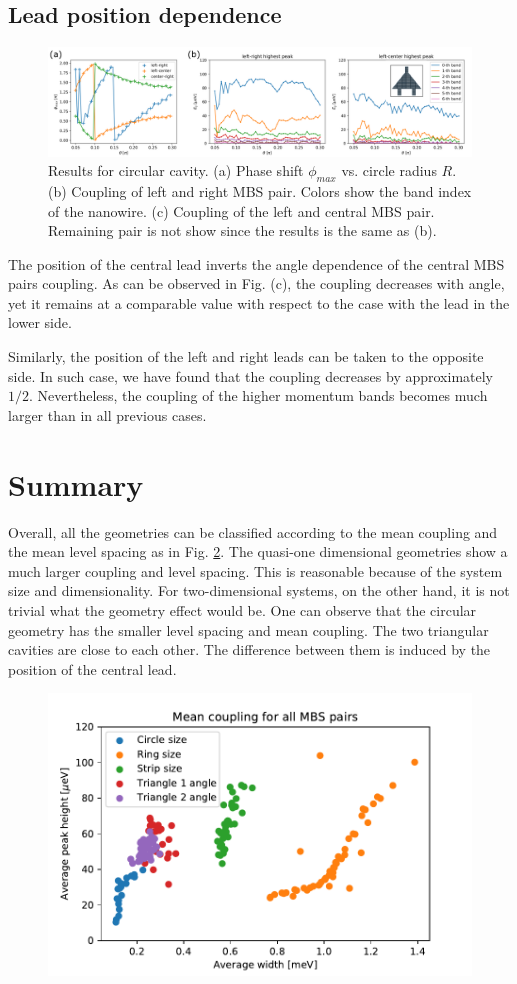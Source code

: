 \subsection{Lead position dependence}

\begin{figure}[h!]
\centering
  \includegraphics[width=0.8\linewidth]{figures/triangle_two_side_results.pdf}
  \caption{Results for circular cavity. (a) Phase shift $\phi_{max}$ vs. circle radius $R$. (b) Coupling of left and right MBS pair. Colors show the band index of the nanowire. (c) Coupling of the left and central MBS pair. Remaining pair is not show since the results is the same as (b).}
  \label{fig:average_ring_coupling}
\end{figure}

The position of the central lead inverts the angle dependence of the central MBS pairs coupling.
As can be observed in Fig. (c), the coupling decreases with angle, yet it remains at a comparable value with respect to the case with the lead in the lower side.

Similarly, the position of the left and right leads can be taken to the opposite side.
In such case, we have found that the coupling decreases by approximately $1/2$.
Nevertheless, the coupling of the higher momentum bands becomes much larger than in all previous cases.

\section{Summary}

Overall, all the geometries can be classified according to the mean coupling and the mean level spacing as in Fig. \ref{fig:comparison}. 
The quasi-one dimensional geometries show a much larger coupling and level spacing.
This is reasonable because of the system size and dimensionality.
For two-dimensional systems, on the other hand, it is not trivial what the geometry effect would be.
One can observe that the circular geometry has the smaller level spacing and mean coupling.
The two triangular cavities are close to each other.
The difference between them is induced by the position of the central lead.

\begin{figure}[h!]
\centering
  \includegraphics[width=0.8\linewidth]{figures/comparison.pdf}
  \caption{}
  \label{fig:comparison}
\end{figure}




